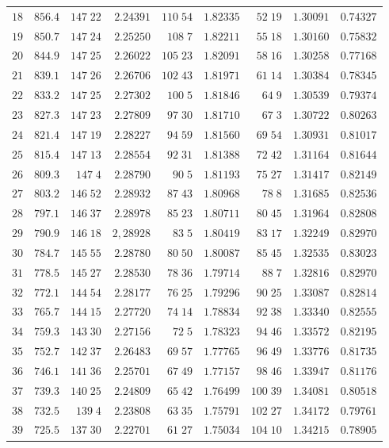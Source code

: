 \begin{center}
\begin{tabular}{r|r|r|r|r|r|r|r|r}
$18$&$856.4$&$147\;22$&$2.24391$&$110\;54$&$1.82335$&$52\;19$&$1.30091$&$0.74327$\\
$19$&$850.7$&$147\;24$&$2.25250$&$108\;7$&$1.82211$&$55\;18$&$1.30160$&$0.75832$\\[2pt]
$20$&$844.9$&$147\;25$&$2.26022$&$105\;23$&$1.82091$&$58\;16$&$1.30258$&$0.77168$\\
$21$&$839.1$&$147\;26$&$2.26706$&$102\;43$&$1.81971$&$61\;14$&$1.30384$&$0.78345$\\
$22$&$833.2$&$147\;25$&$2.27302$&$100\;5$&$1.81846$&$64\;9$&$1.30539$&$0.79374$\\
$23$&$827.3$&$147\;23$&$2.27809$&$97\;30$&$1.81710$&$67\;3$&$1.30722$&$0.80263$\\
$24$&$821.4$&$147\;19$&$2.28227$&$94\;59$&$1.81560$&$69\;54$&$1.30931$&$0.81017$\\[2pt]
$25$&$815.4$&$147\;13$&$2.28554$&$92\;31$&$1.81388$&$72\;42$&$1.31164$&$0.81644$\\
$26$&$809.3$&$147\;4$&$2.28790$&$90\;5$&$1.81193$&$75\;27$&$1.31417$&$0.82149$\\
$27$&$803.2$&$146\;52$&$2.28932$&$87\;43$&$1.80968$&$78\;8$&$1.31685$&$0.82536$\\
$28$&$797.1$&$146\;37$&$2.28978$&$85\;23$&$1.80711$&$80\;45$&$1.31964$&$0.82808$\\
$29$&$790.9$&$146\;18$&$2,28928$&$83\;5$&$1.80419$&$83\;17$&$1.32249$&$0.82970$\\[2pt]
$30$&$784.7$&$145\;55$&$2.28780$&$80\;50$&$1.80087$&$85\;45$&$1.32535$&$0.83023$\\
$31$&$778.5$&$145\;27$&$2.28530$&$78\;36$&$1.79714$&$88\;7$&$1.32816$&$0.82970$\\
$32$&$772.1$&$144\;54$&$2.28177$&$76\;25$&$1.79296$&$90\;25$&$1.33087$&$0.82814$\\
$33$&$765.7$&$144\;15$&$2.27720$&$74\;14$&$1.78834$&$92\;38$&$1.33340$&$0.82555$\\
$34$&$759.3$&$143\;30$&$2.27156$&$72\;5$&$1.78323$&$94\;46$&$1.33572$&$0.82195$\\[2pt]
$35$&$752.7$&$142\;37$&$2.26483$&$69\;57$&$1.77765$&$96\;49$&$1.33776$&$0.81735$\\
$36$&$746.1$&$141\;36$&$2.25701$&$67\;49$&$1.77157$&$98\;46$&$1.33947$&$0.81176$\\
$37$&$739.3$&$140\;25$&$2.24809$&$65\;42$&$1.76499$&$100\;39$&$1.34081$&$0.80518$\\
$38$&$732.5$&$139\;4$&$2.23808$&$63\;35$&$1.75791$&$102\;27$&$1.34172$&$0.79761$\\
$39$&$725.5$&$137\;30$&$2.22701$&$61\;27$&$1.75034$&$104\;10$&$1.34215$&$0.78905$\\[2pt]

\end{tabular}
\end{center}

